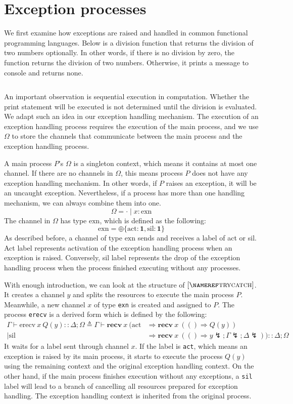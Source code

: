 \documentclass[12pt, openany]{memoir}
\newcommand*{\recv}[2]{\textbf{recv}\ #1\ #2}
\newcommand*{\cancel}[1]{#1 \lightning}
\begin{document}
\section{Exception processes}
We first examine how exceptions are raised and handled in common functional programming languages. 
Below is a division function that returns the division of two numbers optionally. In other words,
if there is no division by zero, the function returns the division of two numbers.
Otherwise, it prints a message to console and returns none. 
\inputminted{ocaml}{code/div.ml} 
An important observation is sequential execution in computation. 
Whether the print statement will be executed is not determined until the division is evaluated. 
We adapt such an idea in our exception handling mechanism. 
The execution of an exception handling process requires the execution of the main process, 
and we use $\Omega$ to store the channels that communicate between the main process and the exception handling process.

A main process $P$'s $\Omega$ is a singleton context, 
which means it contains at most one channel. If there are no channels in $\Omega$, 
this means process $P$ does not have any exception handling mechanism. 
In other words, if $P$ raises an exception, it will be an uncaught exception. 
Nevertheless, if a process has more than one handling mechanism, we can always combine them into one.
\[
  \Omega = \cdot \mid x : \text{exn}
\]
The channel in $\Omega$ has type $\text{exn}$, which is defined as the following:
\[
  \text{exn} = \oplus\{\text{act} : \textbf{1}, \text{sil} : \textbf{1}\}
\]
As described before, a channel of type $\text{exn}$ sends and receives a label of act or sil. 
Act label represents activation of the exception handling process when an exception is raised.
Conversely, sil label represents the drop of the exception handling process when the process finished executing without any processes.

With enough introduction, we can look at the structure of $\ruleref{trycatch}$. 
It creates a channel $y$ and splits the resources to execute the main process $P$.
Meanwhile, a new channel $x$ of type \texttt{exn} is created and assigned to $P$.
The process \texttt{erecv} is a derived form which is defined by the following:
\begin{align*}
  \Gamma \vdash \text{erecv}\ x\ Q(y) :: \Delta ; \Omega \triangleq \Gamma \vdash \recv{x}{(\text{act} &\Rightarrow \recv{x}{(() \Rightarrow Q(y))} \\ 
  \mid \text{sil} &\Rightarrow \recv{x}{(() \Rightarrow \cancel{y}; \cancel{\Gamma}; \cancel{\Delta})})} :: \Delta; \Omega
\end{align*}
It waits for a label sent through channel $x$. If the label is \texttt{act}, 
which means an exception is raised by its main process, 
it starts to execute the process $Q(y)$ using the remaining context and the original exception handling context. 
On the other hand, if the main process finishes execution without any exceptions, 
a \texttt{sil} label will lead to a branch of cancelling all resources prepared for exception handling. 
The exception handling context is inherited from the original process.
\end{document}

